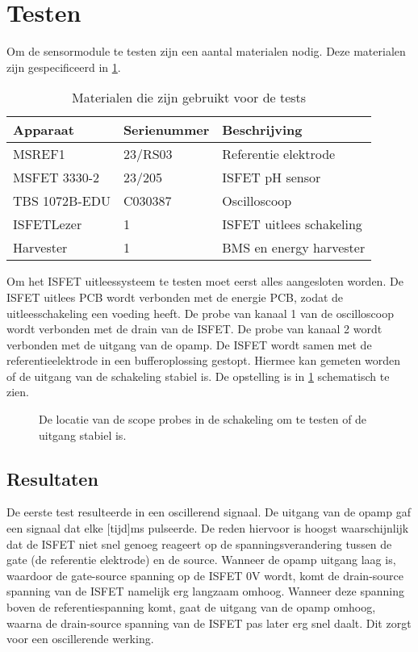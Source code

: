 \section{Testen}
Om de sensormodule te testen zijn een aantal materialen nodig. Deze materialen zijn gespecificeerd in \cref{tab:testMaterialen}.
\begin{table}[ht]
    \centering
    \begin{tabular}{l|l|l}
        Apparaat         & Serienummer & Beschrijving \\
        \hline
        MSREF1           & 23/RS03     & Referentie elektrode       \\
        MSFET 3330-2     & 23/205      & ISFET pH sensor            \\
        TBS 1072B-EDU    & C030387     & Oscilloscoop               \\
        ISFETLezer       & 1           & ISFET uitlees schakeling   \\
        Harvester        & 1           & BMS en energy harvester    \\    
        \hline
    \end{tabular}
    \caption{Materialen die zijn gebruikt voor de tests}
    \label{tab:testMaterialen}
\end{table}

Om het ISFET uitleessysteem te testen moet eerst alles aangesloten worden. De ISFET uitlees PCB wordt verbonden met de energie PCB, zodat de uitleesschakeling een voeding heeft.
De probe van kanaal 1 van de oscilloscoop wordt verbonden met de drain van de ISFET. De probe van kanaal 2 wordt verbonden met de uitgang van de opamp. De ISFET wordt samen met de referentieelektrode in een bufferoplossing gestopt. Hiermee kan gemeten worden of de uitgang van de schakeling stabiel is. De opstelling is in \cref{fig:test ISFET circuit best} schematisch te zien.

\begin{figure}[ht]
    \centering
    \def\svgwidth{0.75\textwidth}
    
    \caption{De locatie van de scope probes in de schakeling om te testen of de uitgang stabiel is.}
    \label{fig:test ISFET circuit best}
\end{figure}


\subsection{Resultaten}

De eerste test resulteerde in een oscillerend signaal. De uitgang van de opamp gaf een signaal dat elke [tijd]ms pulseerde.
De reden hiervoor is hoogst waarschijnlijk dat de ISFET niet snel genoeg reageert op de spanningsverandering tussen de gate (de referentie elektrode) en de source. Wanneer de opamp uitgang laag is, waardoor de gate-source spanning op de ISFET 0V wordt, komt de drain-source spanning van de ISFET namelijk erg langzaam omhoog. Wanneer deze spanning boven de referentiespanning komt, gaat de uitgang van de opamp omhoog, waarna de drain-source spanning van de ISFET pas later erg snel daalt. Dit zorgt voor een oscillerende werking.


